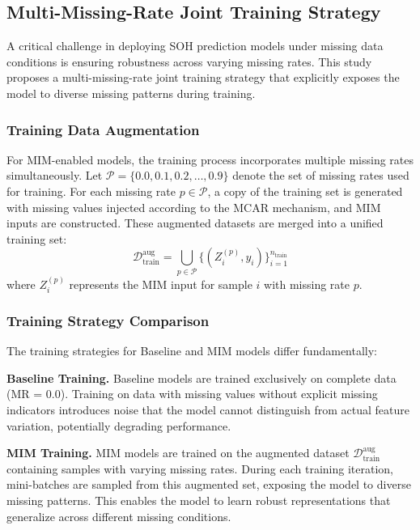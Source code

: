 \documentclass[5p,times]{elsarticle}
\begin{document}
\subsection{Multi-Missing-Rate Joint Training Strategy}\label{sec:training}

A critical challenge in deploying SOH prediction models under missing data conditions is ensuring robustness across varying missing rates. This study proposes a multi-missing-rate joint training strategy that explicitly exposes the model to diverse missing patterns during training.

\subsubsection{Training Data Augmentation}

For MIM-enabled models, the training process incorporates multiple missing rates simultaneously. Let $\mathcal{P} = \{0.0, 0.1, 0.2, \ldots, 0.9\}$ denote the set of missing rates used for training. For each missing rate $p \in \mathcal{P}$, a copy of the training set is generated with missing values injected according to the MCAR mechanism, and MIM inputs are constructed. These augmented datasets are merged into a unified training set:
\begin{equation}
    \mathcal{D}_{\text{train}}^{\text{aug}} = \bigcup_{p \in \mathcal{P}} \{(Z^{(p)}_i, y_i)\}_{i=1}^{n_{\text{train}}}
\end{equation}
where $Z^{(p)}_i$ represents the MIM input for sample $i$ with missing rate $p$.

\subsubsection{Training Strategy Comparison}

The training strategies for Baseline and MIM models differ fundamentally:

\textbf{Baseline Training.} Baseline models are trained exclusively on complete data (MR = 0.0). Training on data with missing values without explicit missing indicators introduces noise that the model cannot distinguish from actual feature variation, potentially degrading performance.

\textbf{MIM Training.} MIM models are trained on the augmented dataset $\mathcal{D}_{\text{train}}^{\text{aug}}$ containing samples with varying missing rates. During each training iteration, mini-batches are sampled from this augmented set, exposing the model to diverse missing patterns. This enables the model to learn robust representations that generalize across different missing conditions.
\end{document}
